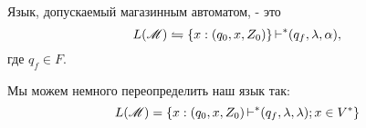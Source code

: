 \begin{definition}
Язык, допускаемый магазинным автоматом, - это
\[
L(\mathscr{M}) \leftrightharpoons \{x: (q_0,x,Z_0)\} \operatorname{\vdash}^{*} (q_f, \lambda, \alpha),
\]
где $q_f \in F$.

\medskip

Мы можем немного переопределить наш язык так:
\[
    L(\mathscr{M}) = \{x: (q_0,x,Z_0) \operatorname{\vdash}^{*} (q_f, \lambda, \lambda); x\in V^{*} \}
\] 
\end{definition}


